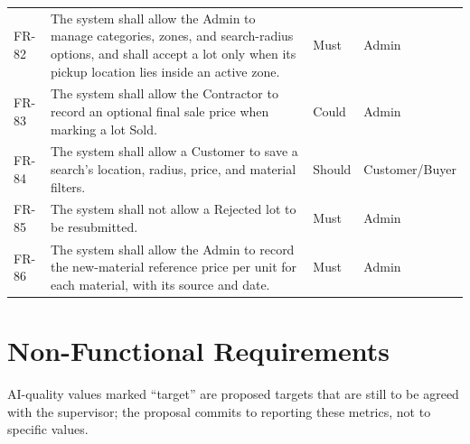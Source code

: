 {\begin{longtable}{@{}p{}p{}p{}p{}@{}}
FR-82 & The system shall allow the Admin to manage categories, zones, and search-radius options, and shall accept a lot only when its pickup location lies inside an active zone. & Must & Admin \\
FR-83 & The system shall allow the Contractor to record an optional final sale price when marking a lot Sold. & Could & Admin \\
FR-84 & The system shall allow a Customer to save a search's location, radius, price, and material filters. & Should & Customer/Buyer \\
FR-85 & The system shall not allow a Rejected lot to be resubmitted. & Must & Admin \\
FR-86 & The system shall allow the Admin to record the new-material reference price per unit for each material, with its source and date. & Must & Admin \\
\bottomrule
\end{longtable}
}

\section{Non-Functional Requirements }
AI-quality values marked ``target'' are proposed targets that are still to be agreed with
the supervisor; the proposal commits to reporting these metrics, not to specific values.

